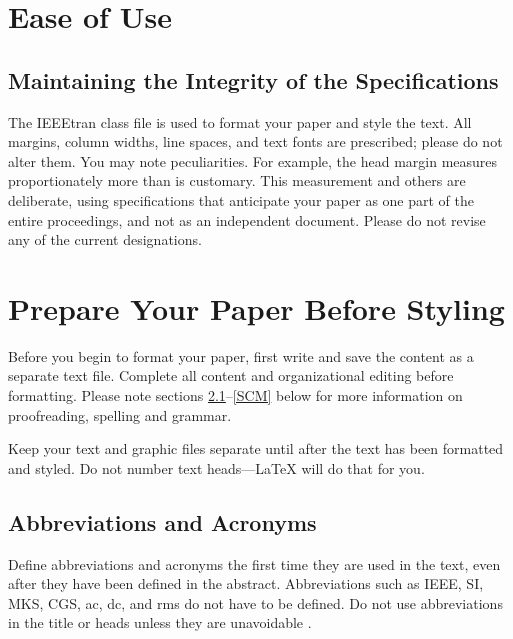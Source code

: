 \documentclass[conference]{IEEEtran}
\begin{document}
\section{Ease of Use}

\subsection{Maintaining the Integrity of the Specifications}

The IEEEtran class file is used to format your paper and style the text. All margins, 
column widths, line spaces, and text fonts are prescribed; please do not 
alter them. You may note peculiarities. For example, the head margin
measures proportionately more than is customary. This measurement 
and others are deliberate, using specifications that anticipate your paper 
as one part of the entire proceedings, and not as an independent document. 
Please do not revise any of the current designations.

\section{Prepare Your Paper Before Styling}
Before you begin to format your paper, first write and save the content as a 
separate text file. Complete all content and organizational editing before 
formatting. Please note sections \ref{AA}--\ref{SCM} below for more information on 
proofreading, spelling and grammar.

Keep your text and graphic files separate until after the text has been 
formatted and styled. Do not number text heads---{\LaTeX} will do that 
for you.

\subsection{Abbreviations and Acronyms}\label{AA}
Define abbreviations and acronyms the first time they are used in the text, 
even after they have been defined in the abstract. Abbreviations such as 
IEEE, SI, MKS, CGS, ac, dc, and rms do not have to be defined. Do not use 
abbreviations in the title or heads unless they are unavoidable \cite{wagner2022quality}.
\end{document}
